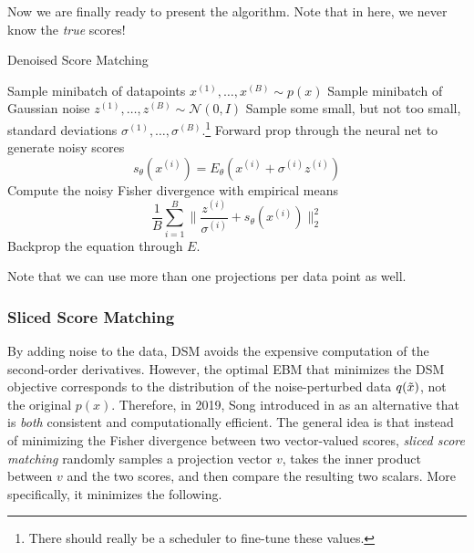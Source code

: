     \begin{algo}
      Now we are finally ready to present the algorithm. Note that in here, we never know the \textit{true} scores! 
      \begin{algorithm}[H]
      \caption{Denoised Score Matching}
      \label{alg:denoised_score_matching}
      \begin{algorithmic}[1]  

          \State Sample minibatch of datapoints $x^{(1)}, \ldots, x^{(B)} \sim p(x)$ 
          \State Sample minibatch of Gaussian noise $z^{(1)}, \ldots, z^{(B)} \sim \mathcal{N}(0, I)$ 
          \State Sample some small, but not too small, standard deviations $\sigma^{(1)}, \ldots, \sigma^{(B)}$.\footnote{There should really be a scheduler to fine-tune these values. }
          \State Forward prop through the neural net to generate noisy scores 
          \begin{equation}
            s_\theta (x^{(i)}) = E_\theta(x^{(i)} + \sigma^{(i)} z^{(i)})
          \end{equation}
          \State Compute the noisy Fisher divergence with empirical means 
          \begin{equation}
            \frac{1}{B} \sum_{i=1}^B \bigg\| \frac{z^{(i)}}{\sigma^{(i)}} + s_\theta (x^{(i)}) \bigg\|_2^2
          \end{equation} 
          \State Backprop the equation through $E$. 
        \EndWhile
      \end{algorithmic}
      \end{algorithm}
      Note that we can use more than one projections per data point as well. 
    \end{algo}

  \subsubsection{Sliced Score Matching}

    By adding noise to the data, DSM avoids the expensive computation of the second-order derivatives. However, the optimal EBM that minimizes the DSM objective corresponds to the distribution of the noise-perturbed data $q(\Tilde{x})$, not the original $p(x)$. Therefore, in 2019, Song introduced in \cite{sliced_score} as an alternative that is \textit{both} consistent and computationally efficient. The general idea is that instead of minimizing the Fisher divergence between two vector-valued scores, \textit{sliced score matching} randomly samples a projection vector $v$, takes the inner product between $v$ and the two scores, and then compare the resulting two scalars. More specifically, it minimizes the following. 


